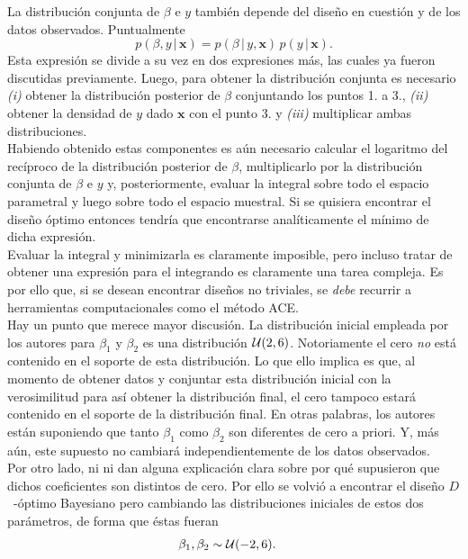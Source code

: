 La distribución conjunta de $\beta$ e $y$ también depende del diseño en cuestión y de los datos observados. Puntualmente
\begin{equation*}
	p( \beta, y \, | \, \mathbf{x} ) = p(\beta \, | \, y, \mathbf{x}) \, p(y \, | \, \mathbf{x}).
\end{equation*}
Esta expresión se divide a su vez en dos expresiones más, las cuales ya fueron discutidas previamente. Luego, para obtener la distribución conjunta es necesario \textit{(i)} obtener la distribución posterior de $\beta$ conjuntando los puntos 1. a 3., \textit{(ii)} obtener la densidad de $y$ dado $\mathbf{x}$ con el punto 3. y \textit{(iii)} multiplicar ambas distribuciones. \\


Habiendo obtenido estas componentes es aún necesario calcular el logaritmo del recíproco de la distribución posterior de $\beta$, multiplicarlo por la distribución conjunta de $\beta$ e $y$ y, posteriormente, evaluar la integral sobre todo el espacio parametral y luego sobre todo el espacio muestral. Si se quisiera encontrar el diseño óptimo entonces tendría que encontrarse analíticamente el mínimo de dicha expresión. \\

Evaluar la integral y minimizarla es claramente imposible, pero incluso tratar de obtener una expresión para el integrando es claramente una tarea compleja. Es por ello que, si se desean encontrar diseños no triviales, se \textit{debe} recurrir a herramientas computacionales como el método ACE. \\






Hay un punto que merece mayor discusión. La distribución inicial empleada por los autores para $\beta_1$ y $\beta_2$ es una distribución $\mathcal{U} (2, 6)$. Notoriamente el cero \textit{no} está contenido en el soporte de esta distribución. Lo que ello implica es que, al momento de obtener datos y conjuntar esta distribución inicial con la verosimilitud para así obtener la distribución final, el cero tampoco estará contenido en el soporte de la distribución final. En otras palabras, los autores están suponiendo que tanto $\beta_1$ como $\beta_2$ son diferentes de cero a priori. Y, más aún, este supuesto no cambiará independientemente de los datos observados. \\


Por otro lado, ni \cite{Woods_etal_2006} ni \cite{Woods_etal} dan alguna explicación clara sobre por qué supusieron que dichos coeficientes son distintos de cero. Por ello se volvió a encontrar el diseño $D$~-óptimo Bayesiano pero cambiando las distribuciones iniciales de estos dos parámetros, de forma que éstas fueran
\begin{align} \label{eq:mod1_params_initial_modified}
\begin{split}
	\beta_1, \beta_2 &\sim \mathcal{U} (-2, 6). 
\end{split}
\end{align}


